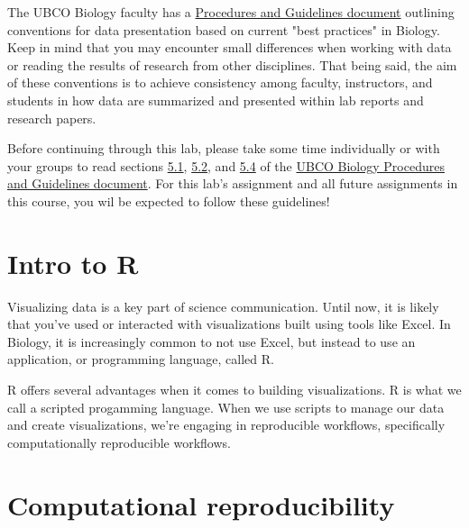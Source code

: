 \documentclass[
]{book}
\begin{document}
The UBCO Biology faculty has a \href{https://ubco-biology.github.io/Procedures-and-Guidelines/figures-tables.html}{Procedures and Guidelines document} outlining conventions for data presentation based on current "best practices" in Biology. Keep in mind that you may encounter small differences when working with data or reading the results of research from other disciplines. That being said, the aim of these conventions is to achieve consistency among faculty, instructors, and students in how data are summarized and presented within lab reports and research papers.

Before continuing through this lab, please take some time individually or with your groups to read sections \href{https://ubco-biology.github.io/Procedures-and-Guidelines/tables.html}{5.1}, \href{https://ubco-biology.github.io/Procedures-and-Guidelines/descriptive-summary-statistics.html}{5.2}, and \href{https://ubco-biology.github.io/Procedures-and-Guidelines/figures.html}{5.4} of the \href{https://ubco-biology.github.io/Procedures-and-Guidelines/figures-tables.html}{UBCO Biology Procedures and Guidelines document}. For this lab's assignment and all future assignments in this course, you wil be expected to follow these guidelines!

\hypertarget{intro-to-r}{%
\chapter*{Intro to R}\label{intro-to-r}}

Visualizing data is a key part of science communication. Until now, it is likely that you've used or interacted with visualizations built using tools like Excel. In Biology, it is increasingly common to not use Excel, but instead to use an application, or programming language, called R.

R offers several advantages when it comes to building visualizations. R is what we call a scripted progamming language. When we use scripts to manage our data and create visualizations, we're engaging in reproducible workflows, specifically computationally reproducible workflows.

\hypertarget{computational-reproducibility}{%
\chapter*{Computational reproducibility}\label{computational-reproducibility}}
\end{document}
